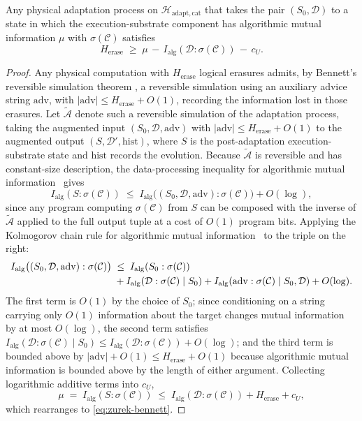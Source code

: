 \documentclass[runningheads]{llncs}
\newcommand{\Hw}{\mathcal{H}}
\newcommand{\Class}{\mathcal{C}}
\newcommand{\MutInfo}{I_{\mathrm{alg}}}
\newcommand{\Herase}{H_{\mathrm{erase}}}
\begin{document}
\begin{lemma}
\label{lem:zurek-bennett}
Any physical adaptation process on $\Hw_{\mathrm{adapt,cat}}$ that
takes the pair $(S_0,\mathcal{D})$ to a state in which the
execution-substrate component has algorithmic mutual information
$\mu$ with $\sigma(\Class)$ satisfies
\begin{equation}
\label{eq:zurek-bennett}
\Herase\;\ge\;\mu\,-\,\MutInfo(\mathcal{D}:\sigma(\Class))\,-\,c_U.
\end{equation}
\end{lemma}
\begin{proof}
Any physical computation with $\Herase$ logical erasures admits,
by Bennett's reversible simulation
theorem \cite{bennett1973logical,bennett1989spacetime}, a reversible simulation using an auxiliary advice string
\(\mathrm{adv}\), with \(|\mathrm{adv}|\le \Herase+O(1)\), recording
the information lost in those erasures. Let
$\tilde{\mathcal{A}}$ denote such a reversible simulation of the
adaptation process, taking the augmented input
$(S_0,\mathcal{D},\mathrm{adv})$ with $|\mathrm{adv}|\le\Herase+O(1)$
to the augmented output
$(S,\mathcal{D}',\mathrm{hist})$, where $S$ is the post-adaptation
execution-substrate state and $\mathrm{hist}$ records the evolution.
Because $\tilde{\mathcal{A}}$ is reversible and has constant-size
description, the data-processing inequality for algorithmic mutual
information~\cite{li2019kolmogorov,hutter2004universal} gives
\begin{equation}
\label{eq:data-processing}
\MutInfo(S:\sigma(\Class))\;\le\;
\MutInfo\bigl((S_0,\mathcal{D},\mathrm{adv}):\sigma(\Class)\bigr)+O(\log),
\end{equation}
since any program computing $\sigma(\Class)$ from $S$ can be
composed with the inverse of $\tilde{\mathcal{A}}$ applied to the
full output tuple at a cost of $O(1)$ program bits. Applying the
Kolmogorov chain rule for algorithmic mutual
information~\cite{li2019kolmogorov} to the triple on the right:
\begin{align}
\MutInfo\bigl((S_0,\mathcal{D},\mathrm{adv}):\sigma(\Class)\bigr)
\;&\le\;
\MutInfo(S_0:\sigma(\Class))\notag\\
&+\MutInfo(\mathcal{D}:\sigma(\Class)\mid S_0)
+\MutInfo(\mathrm{adv}:\sigma(\Class)\mid S_0,\mathcal{D})+O(\log).
\label{eq:chainrule}
\end{align}
The first term is $O(1)$ by the choice of $S_0$; since conditioning
on a string carrying only $O(1)$ information about the target
changes mutual information by at most $O(\log)$, the second term
satisfies $\MutInfo(\mathcal{D}:\sigma(\Class)\mid S_0)\le
\MutInfo(\mathcal{D}:\sigma(\Class))+O(\log)$; and the third term is
bounded above by $|\mathrm{adv}|+O(1)\le\Herase+O(1)$ because
algorithmic mutual information is bounded above by the length of
either argument. Collecting logarithmic additive terms into $c_U$,
\begin{equation}
\mu\;=\;\MutInfo(S:\sigma(\Class))\;\le\;
\MutInfo(\mathcal{D}:\sigma(\Class))+\Herase+c_U,
\end{equation}
which rearranges to \eqref{eq:zurek-bennett}.
\end{proof}
\end{document}
